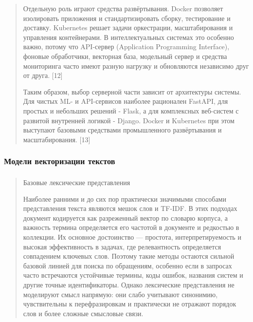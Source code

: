 \begin{quote}
Отдельную роль играют средства развёртывания. Docker позволяет
изолировать приложения и стандартизировать сборку, тестирование и
доставку. Kubernetes решает задачи оркестрации, масштабирования и
управления контейнерами. В интеллектуальных системах это особенно важно,
потому что API-сервер (Application Programming Interface), фоновые
обработчики, векторная база, модельный сервер и средства мониторинга
часто имеют разную нагрузку и обновляются независимо друг от друга.
{[}12{]}

Таким образом, выбор серверной части зависит от архитектуры системы. Для
чистых ML- и API-сервисов наиболее рационален FastAPI, для простых и
небольших решений - Flask, а для комплексных веб-систем с развитой
внутренней логикой - Django. Docker и Kubernetes при этом выступают
базовыми средствами промышленного развёртывания и масштабирования.
{[}13{]}
\end{quote}

\hypertarget{ux43cux43eux434ux435ux43bux438-ux432ux435ux43aux442ux43eux440ux438ux437ux430ux446ux438ux438-ux442ux435ux43aux441ux442ux43eux432}{%
\subsubsection{Модели векторизации
текстов}\label{ux43cux43eux434ux435ux43bux438-ux432ux435ux43aux442ux43eux440ux438ux437ux430ux446ux438ux438-ux442ux435ux43aux441ux442ux43eux432}}

\hypertarget{section-1}{%
\subsubsection{}\label{section-1}}

\begin{quote}
Базовые лексические представления

Наиболее ранними и до сих пор практически значимыми способами
представления текста являются мешок слов и TF-IDF. В этих подходах
документ кодируется как разреженный вектор по словарю корпуса, а
важность термина определяется его частотой в документе и редкостью в
коллекции. Их основное достоинство --- простота, интерпретируемость и
высокая эффективность в задачах, где релевантность определяется
совпадением ключевых слов. Поэтому такие методы остаются сильной базовой
линией для поиска по обращениям, особенно если в запросах часто
встречаются устойчивые термины, коды ошибок, названия систем и другие
точные идентификаторы. Однако лексические представления не моделируют
смысл напрямую: они слабо учитывают синонимию, чувствительны к
перефразировкам и практически не отражают порядок слов и более сложные
смысловые связи.
\end{quote}

